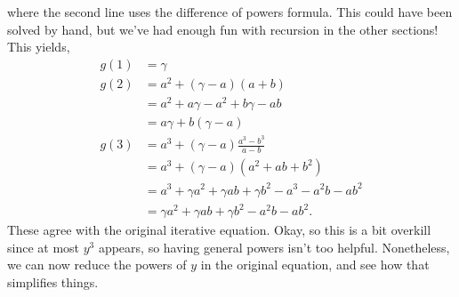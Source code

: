 	where the second line uses the difference of powers formula. This could have been solved by hand, but we've had enough fun with recursion in the other sections! This yields,
	\begin{align}
		g(1) &= \gamma\\
		g(2) &= a^2 + (\gamma - a)(a + b) \\
			&= a^2 + a\gamma - a^2  + b\gamma - ab \\
			&= a\gamma + b(\gamma - a) \\
		g(3) &= a^3 + (\gamma - a)\frac{a^3 - b^3}{a - b} \\
			&= a^3 + (\gamma - a)(a^2 + ab + b^2) \\
			&= a^3 + \gamma a^2 + \gamma ab + \gamma b^2 - a^3 - a^2b - ab^2 \\
			&= \gamma a^2 + \gamma ab + \gamma b^2 - a^2b - ab^2.
	\end{align}
	These agree with the original iterative equation. Okay, so this is a bit overkill since at most $y^3$ appears, so having general powers isn't too helpful. Nonetheless, we can now reduce the powers of $y$ in the original equation, and see how that simplifies things.
